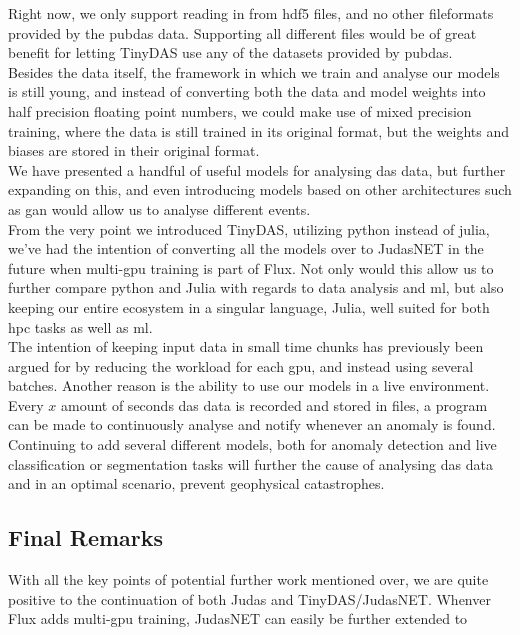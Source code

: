 Right now, we only support reading in from \acrshort{hdf5} files, and no other fileformats provided by the \Gls{pubdas} data. Supporting all different files would be of great benefit for letting TinyDAS use any of the datasets provided by \acrshort{pubdas}. \\

Besides the data itself, the framework in which we train and analyse our models is still young, and instead of converting both the data and model weights into half precision floating point numbers, we could make use of mixed precision training, where the data is still trained in its original format, but the weights and biases are stored in their original format. \\

We have presented a handful of useful models for analysing \acrshort{das} data, but further expanding on this, and even introducing models based on other architectures such as \acrshort{gan} would allow us to analyse different events. \\

From the very point we introduced TinyDAS, utilizing \Gls{python} instead of \Gls{julia}, we've had the intention of converting all the models over to JudasNET in the future when multi-gpu training is part of Flux. Not only would this allow us to further compare python and Julia with regards to data analysis and \acrshort{ml}, but also keeping our entire ecosystem in a singular language, Julia, well suited for both \acrshort{hpc} tasks as well as \acrshort{ml}.  \\

The intention of keeping input data in small time chunks has previously been  argued for by reducing the workload for each \acrshort{gpu}, and instead using several batches. Another reason is the ability to use our models in a live environment. Every $x$ amount of seconds \acrshort{das} data is recorded and stored in files, a program can be made to continuously analyse and notify whenever an anomaly is found. \\

Continuing to add several different models, both for anomaly detection and live classification or segmentation tasks will further the cause of analysing \acrshort{das} data and in an optimal scenario, prevent geophysical catastrophes.

\subsection{Final Remarks}

With all the key points of potential further work mentioned over, we are quite positive to the continuation of both Judas and TinyDAS/JudasNET. Whenver Flux adds multi-gpu training, JudasNET can easily be further extended to 